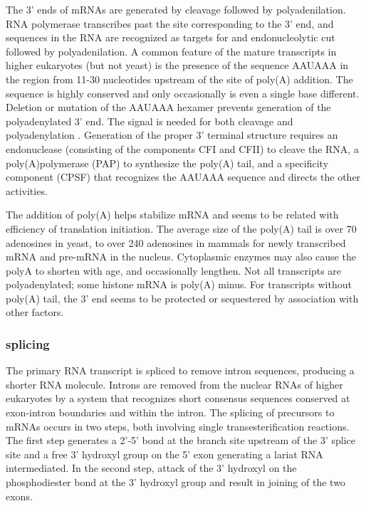 The 3' ends of mRNAs are generated by cleavage followed by
polyadenilation. RNA polymerase transcribes past the site
corresponding to the 3' end, and sequences in the RNA are recognized
as targets for and endonucleolytic cut followed by polyadenilation. A
common feature of the mature transcripts in higher eukaryotes (but not
yeast) is the presence of the sequence AAUAAA in the region from 11-30
nucleotides upstream of the site of poly(A) addition. The sequence is
highly conserved and only occasionally is even a single base
different. Deletion or mutation of the AAUAAA hexamer prevents
generation of the polyadenylated 3' end. The signal is needed for both
cleavage and polyadenylation \citep{lewis:1997a}. Generation of the
proper 3' terminal structure requires an endonuclease (consisting of
the components CFI and CFII) to cleave the RNA, a poly(A)polymerase
(PAP) to synthesize the poly(A) tail, and a specificity component
(CPSF) that recognizes the AAUAAA sequence and directs the other
activities.

The addition of poly(A) helps stabilize mRNA and seems to be related
with efficiency of translation initiation. The average size of the
poly(A) tail is over 70 adenosines in yeast, to over 240 adenosines in
mammals for newly transcribed mRNA and pre-mRNA in the
nucleus. Cytoplasmic enzymes may also cause the polyA to shorten with
age, and occasionally lengthen. Not all transcripts are
polyadenylated; some histone mRNA is poly(A) minus. For transcripts
without poly(A) tail, the 3' end seems to be protected or sequestered
by association with other factors.

\subsubsection{splicing}

The primary RNA transcript is spliced to remove intron sequences,
producing a shorter RNA molecule. Introns are removed from the
nuclear RNAs of higher eukaryotes by a system that recognizes short
consensus sequences conserved at exon-intron boundaries and within the
intron. The splicing of precursors to mRNAs occurs in two steps, both
involving single transesterification reactions. The first step
generates a 2'-5' bond at the branch site upstream of the 3' splice
site and a free 3' hydroxyl group on the 5' exon generating a lariat
RNA intermediated.  In the second step, attack of the 3' hydroxyl on
the phosphodiester bond at the 3' hydroxyl group and result in joining
of the two exons.


